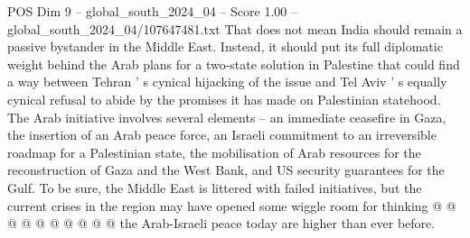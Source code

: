 \begin{textsample}{POS Dim 9 – global\_south\_2024\_04 – Score 1.00 – global\_south\_2024\_04/107647481.txt}
That does not mean India should remain a passive bystander in the Middle East.
Instead, it should put its full diplomatic weight behind the Arab plans for a two-state solution in Palestine that could find a way between Tehran ' s cynical hijacking of the issue and Tel Aviv ' s equally cynical refusal to abide by the promises it has made on Palestinian statehood.
The Arab initiative involves several elements -- an immediate ceasefire in Gaza, the insertion of an Arab peace force, an Israeli commitment to an irreversible roadmap for a Palestinian state, the mobilisation of Arab resources for the reconstruction of Gaza and the West Bank, and US security guarantees for the Gulf.
To be sure, the Middle East is littered with failed initiatives, but the current crises in the region may have opened some wiggle room for thinking @ @ @ @ @ @ @ @ @ @ the Arab-Israeli peace today are higher than ever before.

\end{textsample}
